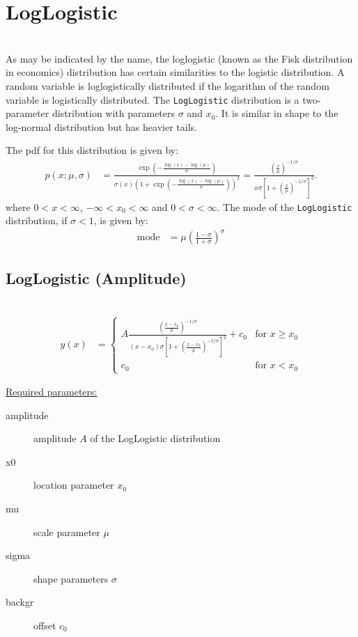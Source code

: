 \clearpage

\section{LogLogistic} ~\\
\label{sec:LogLogistic}
As may be indicated by the name, the loglogistic (known as the Fisk distribution in economics)
distribution has certain similarities to the logistic distribution. A random variable
is loglogistically distributed if the logarithm of the random variable is logistically distributed.
The \texttt{LogLogistic} distribution is a two-parameter distribution with parameters
$\sigma$ and $x_0$. It is similar in shape to the log-normal distribution but has heavier tails.

The pdf for this distribution is given by:
\begin{align}
p(x;\mu,\sigma) &=\frac{\exp\left(-\frac{\log\left(x\right)-\log(\mu)}{\sigma}\right)}{\sigma \left(x\right)\left(1+\exp\left(-\frac{\log(x)-\log(\mu)}{\sigma}\right)\right)^2}
= \frac{ \left(\frac{x}{\mu}\right)^{-1/\sigma} } { x\sigma\left[ 1+\left(\frac{x}{\mu}\right)^{-1/\sigma} \right]^2 }.
\end{align}
where $0 < x < \infty$, $-\infty < x_0 < \infty$ and $0 < \sigma < \infty$.
The mode of the \texttt{LogLogistic} distribution, if $\sigma < 1$, is given by:
\begin{align}
\mathrm{mode} &= \mu\left(\frac{1-\sigma}{1+\sigma}\right)^{\sigma}
\end{align}

\vspace{1cm}

\subsection{LogLogistic (Amplitude)} ~\\
\label{sec:LogLogisticAmplitude}
\begin{align}
y(x) &=
\begin{cases}
A \frac{ \left(\frac{x-x_0}{\mu}\right)^{-1/\sigma} } { \left(x-x_0\right)\sigma\left[ 1+\left(\frac{x-x_0}{\mu}\right)^{-1/\sigma} \right]^2 } +c_0 & \mbox{for } x \geq x_0\\
c_0 & \mbox{for } x<x_0
\end{cases}
\end{align}

\uline{Required parameters:}
\begin{description}
    \item[amplitude] amplitude $A$ of the LogLogistic distribution
    \item[x0] location parameter $x_0$
    \item[mu] scale parameter $\mu$
    \item[sigma] shape parameters $\sigma$
    \item[backgr] offset $c_0$
\end{description}


